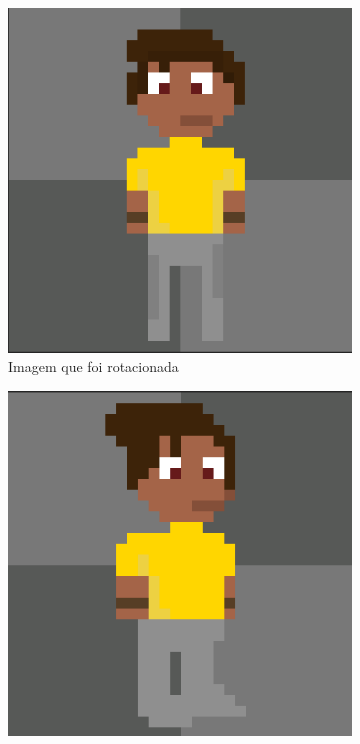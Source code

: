 \begin{figure}[htbp]
    \centering
    \caption{\small Processo da utilização 2 da ferramenta de rotação do PixelLab em julho/2025}
    \label{fig:pixelLabRotacao3}

    \begin{subfigure}{0.32\linewidth}
        \includegraphics[width=1\linewidth]{figs/pixelLab/dia2/sprite_centro.PNG}
        \caption{\small Imagem que foi rotacionada}
        \label{fig:pixelLabRot3a}
    \end{subfigure}
    \begin{subfigure}{0.32\linewidth}
        \includegraphics[width=1\linewidth]{figs/pixelLab/dia2/rot45res3.PNG}

\end{subfigure}
\end{figure}
